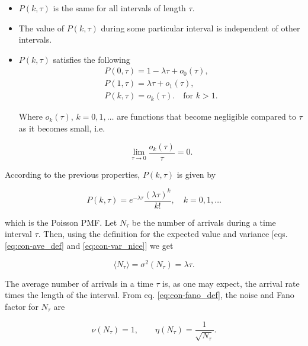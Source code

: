 \begin{itemize}
  \item  $P(k,\tau)$ is the same for all intervals of length $\tau$.
  \item  The value of $P(k,\tau)$ during some particular interval is independent of other intervals.
  \item $P(k,\tau)$ satisfies the following
    \begin{equation*}
      \begin{split}
        P(0,\tau)=1-\lambda\tau+o_0(\tau),\\
        P(1,\tau)=\lambda\tau+o_1(\tau),\\
        P(k,\tau)=o_k(\tau).\quad\text{for } k>1.
      \end{split}
    \end{equation*}
    
    Where $o_k(\tau)$, $k=0,1,\dotsc$ are functions that become negligible compared to $\tau$ as it becomes small, i.e.

    \begin{equation*}
      \lim_{\tau\to 0}\frac{o_k(\tau)}{\tau}=0.
    \end{equation*}
\end{itemize}

According to the previous properties, $P(k,\tau)$ is given by

\begin{equation*}
  P(k,\tau) = e^{-\lambda\tau}\frac{(\lambda\tau)^k}{k!},\quad k=0,1,\dotsc
\end{equation*}

which is the Poisson PMF. Let $N_\tau$ be the number of arrivals during a time interval $\tau$. Then, using the definition for the expected value and variance [eqs. \eqref{eq:con-ave_def} and \eqref{eq:con-var_nice}] we get

\begin{equation*}
  \langle N_\tau\rangle = \sigma^2(N_\tau) = \lambda \tau.
\end{equation*}

The average number of arrivals in a time $\tau$ is, as one may expect, the arrival rate times the length of the interval. From eq. \eqref{eq:con-fano_def}, the noise and Fano factor for $N_\tau$ are

\begin{equation*}
  \nu(N_\tau) = 1,\quad\quad \eta(N_\tau) = \frac{1}{\sqrt{N_\tau}}.
\end{equation*}

